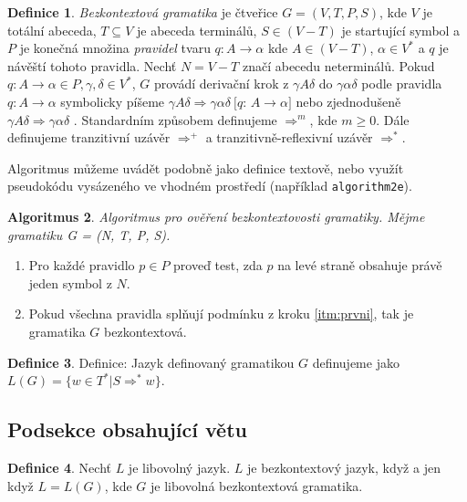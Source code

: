 \documentclass[11pt,twocolumn,a4paper]{article}
\theoremstyle{definition}
\newtheorem{definition}{Definice}[section]
\newtheorem{algorithm}[definition]{Algoritmus}
\begin{document}
\begin{definition} \label{def:definice} 
\emph{Bezkontextová gramatika} je čtveřice $G = (V,T,P,S)$, kde $V$ je totální abeceda,
$T\subseteq V$ je abeceda terminálů, $S \in (V - T)$ je startující symbol a $P$ je konečná množina \emph{pravidel}
tvaru $q: A \rightarrow \alpha $ kde $A \in (V - T)$, $\alpha \in V^* $  a $q$ je návěští tohoto pravidla. Nechť $N = V - T$ značí abecedu neterminálů.
Pokud $q: A \rightarrow \alpha \in P, \gamma, \delta \in V^*$, $G$  provádí derivační krok z $\gamma A \delta$ do $\gamma \alpha \delta$ podle pravidla $q: A \rightarrow \alpha$ symbolicky píšeme 
$\gamma A \delta \Rightarrow \gamma \alpha \delta~[q$: $ A \rightarrow \alpha]$ nebo zjednodušeně $\gamma A \delta \Rightarrow \gamma \alpha \delta$ . Standardním způsobem definujeme $\Rightarrow ^m$, kde $m \geq 0$. Dále definujeme 
tranzitivní uzávěr $\Rightarrow ^+$ a tranzitivně-reflexivní uzávěr $\Rightarrow^*$.
\end{definition}

Algoritmus můžeme uvádět podobně jako definice textově, nebo využít pseudokódu vysázeného ve vhodném prostředí (například \texttt{algorithm2e}).

\begin{algorithm}
\emph {Algoritmus pro ověření bezkontextovosti gramatiky. Mějme gramatiku G = (N, T, P, S).}
\begin{enumerate}
\item \label{itm:prvni} Pro každé pravidlo $p \in P$ proveď test, zda $p$ na levé straně obsahuje právě jeden symbol z $N$.
\item Pokud všechna pravidla splňují podmínku z kroku \ref{itm:prvni}, tak je gramatika $G$ bezkontextová.
\end{enumerate}

\end{algorithm}

\begin{definition}
Definice: Jazyk definovaný gramatikou $G$ definujeme jako $L(G) = \{w \in T^*|S  \Rightarrow ^* w \}$.
\end{definition}

\subsection{Podsekce obsahující větu}

\begin{definition}
Nechť $L$ je libovolný jazyk. $L$ je bezkontextový jazyk, když a jen když $L = L(G)$, kde $G$ je libovolná bezkontextová gramatika.
\end{definition}
\end{document}
